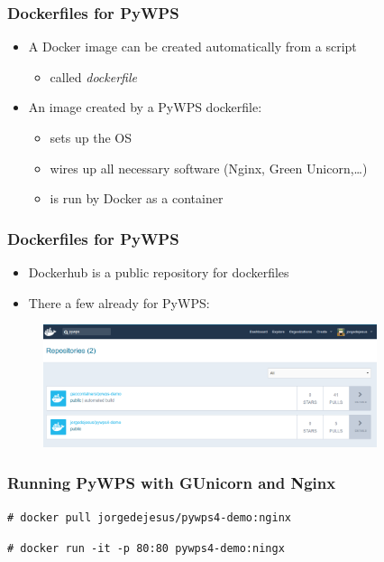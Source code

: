 \documentclass{beamer}
\begin{document}
\begin{frame}
\frametitle<presentation>{Dockerfiles for PyWPS}

\begin{itemize}
  \item A Docker image can be created automatically from a script
   \begin{itemize} \item called \textit{dockerfile} \end{itemize}
  \item An image created by a PyWPS dockerfile: 
  \begin{itemize} 
    \item sets up the OS 
    \item wires up all necessary software (Nginx, Green Unicorn,\ldots)
    \item is run by Docker as a container   
  \end{itemize}
\end{itemize}

\end{frame}


\begin{frame}
\frametitle<presentation>{Dockerfiles for PyWPS}

\begin{itemize}
  \item Dockerhub is a public repository for dockerfiles
  \item There a few already for PyWPS:   
\end{itemize}

  \begin{figure}[ht]
   \centering
   \includegraphics[height=3.6cm]{figures/DockerfilesPyWPS}
  \end{figure}

\end{frame}

\begin{frame}
\frametitle<presentation>{Running PyWPS with GUnicorn and Nginx}

\texttt{\# docker pull jorgedejesus/pywps4-demo:nginx}

\texttt{\# docker run -it -p 80:80 pywps4-demo:ningx}

\end{frame}
\end{document}
